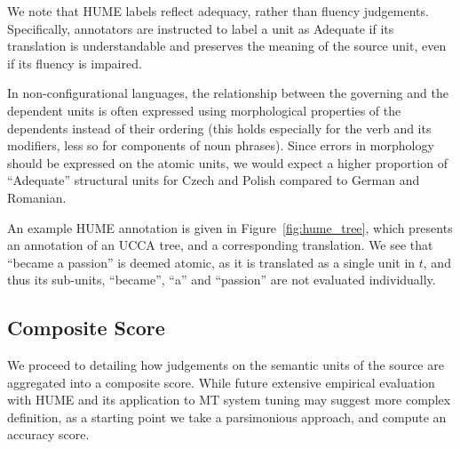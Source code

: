 \documentclass[11pt]{article}
\newcommand{\figref}[1]{Figure~\ref{#1}}
\newcommand{\oa}[1]{}
\begin{document}
We note that HUME labels reflect adequacy, rather than fluency judgements.
Specifically, annotators are instructed to
label a unit as Adequate if its translation is understandable and preserves
the meaning of the source unit, even if its fluency is impaired.

In non-configurational languages, the relationship between the
governing and the dependent units is often expressed using morphological
properties of the dependents instead of their ordering
(this holds especially for the verb and its modifiers,
less so for components of noun phrases). Since errors in morphology
should be expressed on the atomic units, we would expect
a higher proportion of ``Adequate'' structural units for Czech and Polish
compared to German and Romanian\oa{but doesn't German also have a case system? Ondrej:
  could you pinpoint what the difference exactly is?}.

An example HUME annotation is given in \figref{fig:hume_tree},
which presents an annotation of an UCCA tree, and a corresponding translation.
We see that ``became a passion'' is deemed atomic, as it is translated as a single unit
in $t$, and thus its sub-units, ``became'', ``a'' and ``passion'' are not evaluated
individually. 



\subsection{Composite Score}\label{sec:score}

We proceed to detailing how judgements on the semantic units
of the source are aggregated into a composite score.
While future extensive empirical evaluation with HUME and its application to MT
system tuning may suggest more complex definition,
as a starting point we take a parsimonious approach,
and compute an accuracy score.
\end{document}
